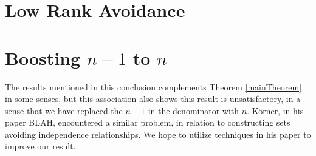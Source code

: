 \section{Low Rank Avoidance}

\section{Boosting $n-1$ to $n$}

The results mentioned in this conclusion complements Theorem \ref{mainTheorem} in some senses, but this association also shows this result is unsatisfactory, in a sense that we have replaced the $n-1$ in the denominator with $n$. K\"{o}rner, in his paper BLAH, encountered a similar problem, in relation to constructing sets avoiding independence relationships. We hope to utilize techniques in his paper to improve our result.

\endinput